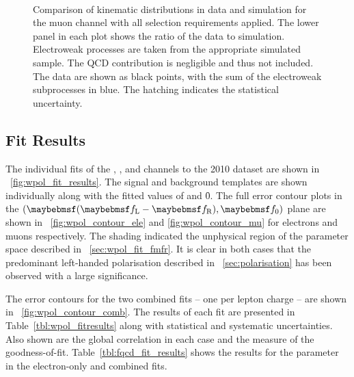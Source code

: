 \begin{figure}[t]
\centering
{}
\\
\caption{Comparison of kinematic distributions in data and simulation for the
  muon channel with all selection requirements applied. The lower panel in each
  plot shows the ratio of the data to simulation. Electroweak processes are
  taken from the appropriate simulated sample. The \ac{QCD} contribution is
  negligible and thus not included. The data are shown as black points, with the
  sum of the electroweak subprocesses in blue. The hatching indicates the
  statistical uncertainty.}
\label{fig:wpol_datamc_mu}
\end{figure}




\subsection{Fit Results}
The individual fits of the \Pep, \Pem, \Pgmp and \Pgmm channels to the 2010
dataset are shown in \fig~\ref{fig:wpol_fit_results}. The signal and
background templates are shown individually along with the fitted values of
\fLmfR and \f0. The full error contour plots in the $(\fLmfR, \f0)$ plane are
shown in \figs~\ref{fig:wpol_contour_ele} and \ref{fig:wpol_contour_mu} for
electrons and muons respectively. The shading indicated the unphysical region of
the parameter space described in \sec~\ref{sec:wpol_fit_fmfr}. It is clear in
both cases that the predominant left-handed polarisation described in
\sec~\ref{sec:polarisation} has been observed with a large significance.

The error contours for the two combined fits -- one per lepton charge -- are shown
in \fig~\ref{fig:wpol_contour_comb}. The results of each fit are presented in
Table~\ref{tbl:wpol_fitresults} along with statistical and systematic
uncertainties. Also shown are the global correlation in each case and the \chisq
measure of the goodness-of-fit. Table~\ref{tbl:fqcd_fit_results} shows the
results for the parameter \fQCD in the electron-only and combined fits.

